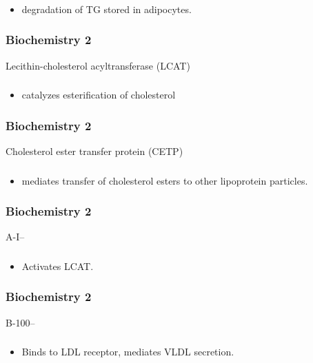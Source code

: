 \documentclass[11pt]{beamer}
\begin{document}
\begin{frame}
 \frametitle{}
\begin{itemize}
\item degradation of TG stored in adipocytes.
\end{itemize}
\end{frame}

\begin{frame}
 \frametitle{Biochemistry 2}
Lecithin-cholesterol acyltransferase (LCAT)
\end{frame}

\begin{frame}
 \frametitle{}
\begin{itemize}
\item catalyzes esterification of cholesterol
\end{itemize}
\end{frame}

\begin{frame}
 \frametitle{Biochemistry 2}
Cholesterol ester transfer protein (CETP)
\end{frame}

\begin{frame}
 \frametitle{}
\begin{itemize}
\item mediates transfer of cholesterol esters to
other lipoprotein particles.
\end{itemize}
\end{frame}

\begin{frame}
 \frametitle{Biochemistry 2}
A-I–
\end{frame}

\begin{frame}
 \frametitle{}
\begin{itemize}
\item Activates LCAT.
\end{itemize}
\end{frame}

\begin{frame}
 \frametitle{Biochemistry 2}
B-100–
\end{frame}

\begin{frame}
 \frametitle{}
\begin{itemize}
\item Binds to LDL receptor, mediates VLDL secretion.
\end{itemize}
\end{frame}
\end{document}

